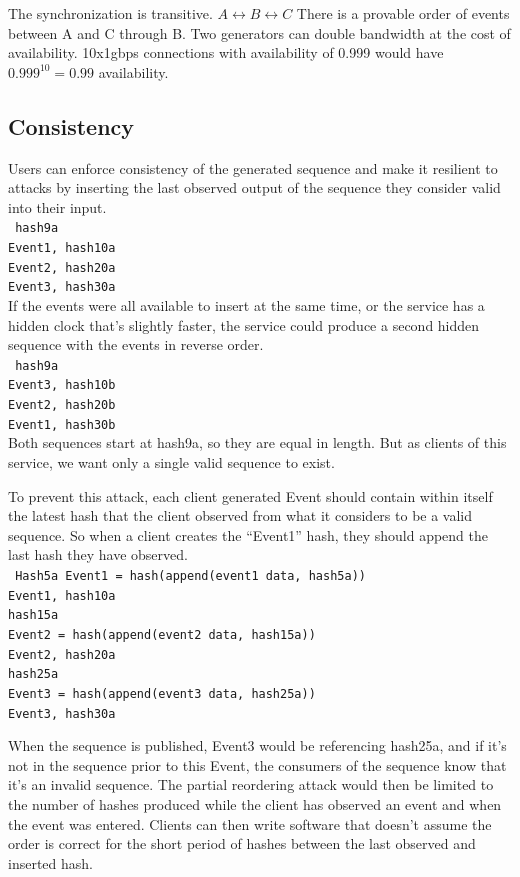 \documentclass[12pt]{article}
\begin{document}
The synchronization is transitive.  \(A \leftrightarrow B \leftrightarrow C\)  There is a provable order of events between A and C through B.  Two generators can double bandwidth at the cost of availability.  10x1gbps connections with availability of 0.999 would have \(0.999^{10} = 0.99 \) availability.
\subsection{Consistency}
Users can enforce consistency of the generated sequence and make it resilient to attacks by inserting the last observed output of the sequence they consider valid into their input.\\
\texttt{
hash9a\\
Event1, hash10a\\
Event2, hash20a\\
Event3, hash30a\\
}
If the events were all available to insert at the same time, or the service has a hidden clock that's slightly faster, the service could produce a second hidden sequence with the events in reverse order.\\ 
\texttt{
hash9a\\
Event3, hash10b\\
Event2, hash20b\\
Event1, hash30b\\
}
Both sequences start at hash9a, so they are equal in length.  But as clients of this service, we want only a single valid sequence to exist. 

To prevent this attack, each client generated Event should contain within itself the latest hash that the client observed from what it considers to be a valid sequence.  So when a client creates the “Event1” hash, they should append the last hash they have observed.\\
\texttt{
Hash5a
Event1 = hash(append(event1 data, hash5a))\\
Event1, hash10a\\
hash15a\\
Event2 = hash(append(event2 data, hash15a))\\
Event2, hash20a\\
hash25a\\
Event3 = hash(append(event3 data, hash25a))\\
Event3, hash30a\\
}

When the sequence is published, Event3 would be referencing hash25a, and if it’s not in the sequence prior to this Event, the consumers of the sequence know that it’s an invalid sequence.  The partial reordering attack would then be limited to the number of hashes produced while the client has observed an event and when the event was entered.  Clients can then write software that doesn’t assume the order is correct for the short period of hashes between the last observed and inserted hash.
\end{document}
